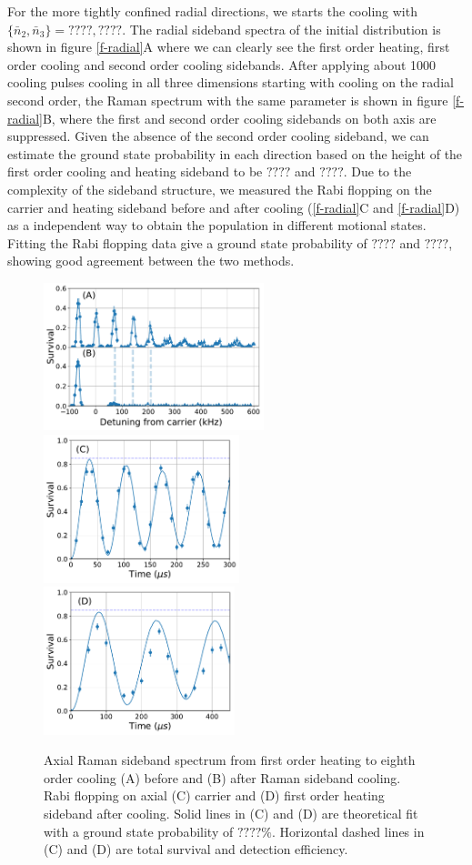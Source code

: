 \documentclass[aps,prl,twocolumn,groupedaddress]{revtex4-1}
\begin{document}
For the more tightly confined radial directions,
we starts the cooling with $\{\bar n_2, \bar n_3\}=????, ????$.
The radial sideband spectra of the initial distribution is shown in figure \ref{f-radial}A
where we can clearly see the first order heating, first order cooling and
second order cooling sidebands.
After applying about 1000 cooling pulses cooling in all three dimensions
starting with cooling on the radial second order,
the Raman spectrum with the same parameter is shown in figure \ref{f-radial}B,
where the first and second order cooling sidebands on both axis are suppressed.
Given the absence of the second order cooling sideband,
we can estimate the ground state probability in each direction based on the height of
the first order cooling and heating sideband to be $????$ and $????$.
Due to the complexity of the sideband structure,
we measured the Rabi flopping on the carrier and heating sideband before and after cooling
(\ref{f-radial}C and \ref{f-radial}D)
as a independent way to obtain the population in different motional states.
Fitting the Rabi flopping data give a ground state probability of $????$ and $????$,
showing good agreement between the two methods.
\begin{figure}
  \includegraphics[height=4.3cm]{imgs/spectrum_a1.pdf}
  \includegraphics[height=4.3cm]{imgs/rabi_flop_a1_0.pdf}
  \includegraphics[height=4.3cm]{imgs/rabi_flop_a1_p1.pdf}
  \caption{Axial Raman sideband spectrum from first order heating to eighth order cooling
    (A) before and (B) after Raman sideband cooling.
    Rabi flopping on axial (C) carrier and (D) first order heating sideband
    after cooling.
    Solid lines in (C) and (D) are theoretical fit with a ground state probability of $????\%$.
    Horizontal dashed lines in (C) and (D) are total survival and detection efficiency.
    \label{f-axial}}
\end{figure}
\end{document}
